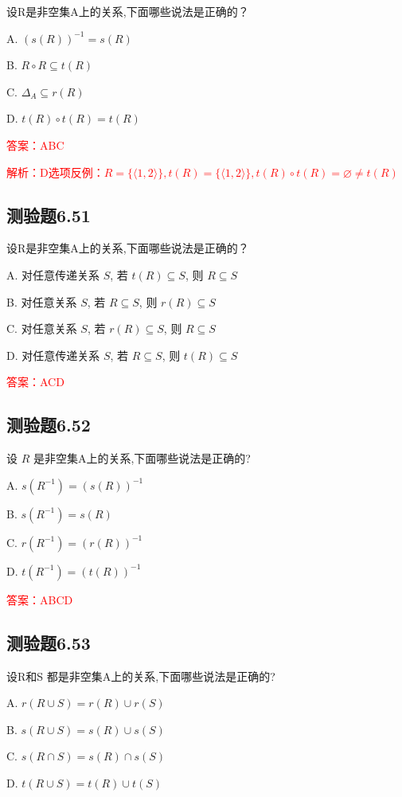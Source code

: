 \documentclass[UTF8, heading=true]{ctexart}
\begin{document}
设R是非空集A上的关系,下面哪些说法是正确的？

A. $(s(R))^{-1}=s(R)$

B. $R \circ R \subseteq t(R)$

C. $\Delta_A \subseteq r(R)$

D. $t(R) \circ t(R)=t(R)$

\textcolor{red}{答案：ABC}

\textcolor{red}{解析：D选项反例：$R=\{\langle 1,2\rangle \}, t(R)=\{\langle 1,2\rangle \}, t(R) \circ t(R)= \varnothing \neq t(R)$}

\subsection{测验题6.51}

设R是非空集A上的关系,下面哪些说法是正确的？

A. 对任意传递关系 $S$, 若 $t(R) \subseteq S$, 则 $R \subseteq S$

B. 对任意关系 $S$, 若 $R \subseteq S$, 则 $r(R) \subseteq S$

C. 对任意关系 $S$, 若 $r(R) \subseteq S$, 则 $R \subseteq S$

D. 对任意传递关系 $S$, 若 $R \subseteq S$, 则 $t(R) \subseteq S$

\textcolor{red}{答案：ACD}

\subsection{测验题6.52}

设 $R$ 是非空集A上的关系,下面哪些说法是正确的?

A. $s\left(R^{-1}\right)=(s(R))^{-1}$

B. $s\left(R^{-1}\right)=s(R)$

C. $r\left(R^{-1}\right)=(r(R))^{-1}$

D. $t\left(R^{-1}\right)=(t(R))^{-1}$

\textcolor{red}{答案：ABCD}


\subsection{测验题6.53}
设R和S 都是非空集A上的关系,下面哪些说法是正确的?

A. $r(R \cup S)=r(R) \cup r(S)$

B. $s(R \cup S)=s(R) \cup s(S)$

C. $s(R \cap S)=s(R) \cap s(S)$

D. $t(R \cup S)=t(R) \cup t(S)$
\end{document}
